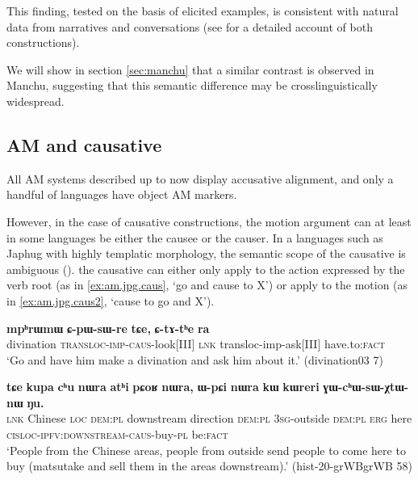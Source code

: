 \documentclass{article}
\newcommand{\ipa}[1]{\textbf{{\phon\mbox{#1}}}} %
\begin{document}
This finding, tested on the basis of elicited examples, is consistent with natural data from narratives and conversations (see \citealt{jacques13harmonization} for a detailed account of both constructions).
  
We will show in section \ref{sec:manchu} that a similar contrast is observed in Manchu, suggesting that this semantic difference may be crosslinguistically widespread.

  
\subsection{AM and causative} \label{sec:japhug.am.caus}
All AM systems described up to now display accusative alignment, and only a handful of languages have object AM markers. 

However, in the case of causative constructions, the motion argument can at least in some languages be either the causee or the causer. In a languages such as Japhug with highly templatic morphology, the semantic scope of the causative is ambiguous (\citealt[182]{jacques15causative}). the causative can either only apply to the action expressed by the verb root (as in  \ref{ex:am.jpg.caus}, `go and cause to X')  or apply to the motion (as in \ref{ex:am.jpg.caus2}, `cause to go and X').


  \begin{exe}
\ex \label{ex:am.jpg.caus}
\gll
\ipa{mpʰrɯmɯ} 	\ipa{ɕ-pɯ-sɯ-re} 	\ipa{tɕe,} 	\ipa{ɕ-tɤ-tʰe} 	\ipa{ra} \\
divination \textsc{transloc-imp-caus}-look[III] \textsc{lnk} transloc-imp-ask[III] have.to:\textsc{fact} \\
\glt  `Go and have him make a divination and ask him about it.' (divination03 7)
  \end{exe} 

  \begin{exe}
\ex \label{ex:am.jpg.caus2}
\gll
\ipa{tɕe} 	\ipa{kupa} 	\ipa{cʰu} 	\ipa{nɯra} 	\ipa{atʰi} 	\ipa{pɕoʁ} 	\ipa{nɯra,} 	\ipa{ɯ-pɕi} 	\ipa{nɯra} 	\ipa{kɯ} 	\ipa{kɯreri} 	\ipa{ɣɯ-cʰɯ-sɯ-χtɯ-nɯ} 	\ipa{ŋu.}  \\
\textsc{lnk} Chinese \textsc{loc} \textsc{dem:pl} downstream direction \textsc{dem:pl} \textsc{3sg}-outside  \textsc{dem:pl}  \textsc{erg} here \textsc{cisloc-ipfv:downstream-caus}-buy-\textsc{pl} be\textsc{:fact} \\
\glt `People from the Chinese areas, people from outside send people to come here to buy (matsutake and sell them in the areas downstream).' (hist-20-grWBgrWB 58)
  \end{exe} 
  
\end{document}
